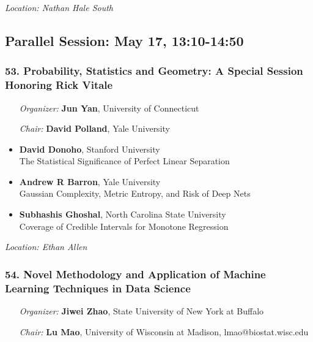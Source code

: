 \emph{Location: Nathan Hale South}

\subsection*{Parallel Session: May 17, 13:10-14:50}

\subsubsection*{53. Probability, Statistics and Geometry: A Special Session Honoring Rick Vitale}

\begin{enumerate}[align=left]
\item [\emph{Organizer:}] \textbf{Jun Yan}, University of Connecticut
\item [\emph{Chair:}] \textbf{David Polland},  Yale University
\end{enumerate}

\begin{itemize}
\item \textbf{David Donoho}, Stanford University \\
The Statistical Significance of Perfect Linear Separation
\item \textbf{Andrew R Barron}, Yale University \\
Gaussian Complexity, Metric Entropy, and Risk of Deep Nets
\item \textbf{Subhashis Ghoshal}, North Carolina State University \\
Coverage of Credible Intervals for Monotone Regression
\end{itemize}

\emph{Location: Ethan Allen}

\subsubsection*{54. Novel Methodology and Application of Machine Learning Techniques in Data Science}

\begin{enumerate}[align=left]
\item [\emph{Organizer:}] \textbf{Jiwei Zhao}, State University of New York at Buffalo
\item [\emph{Chair:}] \textbf{Lu Mao},  University of Wisconsin at Madison, lmao@biostat.wisc.edu
\end{enumerate}

